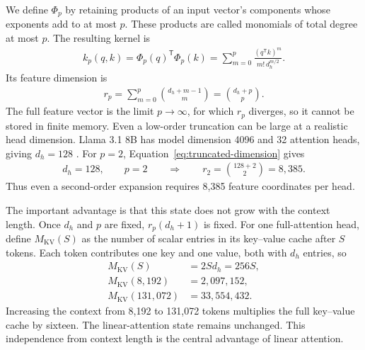 \documentclass[11pt]{article}
\begin{document}
We define $\Phi_p$ by retaining products of an input vector's components whose
exponents add to at most $p$.  These products are called monomials of total
degree at most $p$.  The resulting kernel is
\begin{equation}
  \begin{split}
  k_p(q,k)
  =\Phi_p(q)^{\mathsf T}\Phi_p(k)
  =\sum_{m=0}^{p}\frac{(q^{\mathsf T}k)^m}{m!\,d_h^{m/2}}.
  \label{eq:truncated-kernel}
  \end{split}
\end{equation}
Its feature dimension is
\begin{equation}
  \begin{split}
  r_p
  =\sum_{m=0}^{p}\binom{d_h+m-1}{m}
  =\binom{d_h+p}{p}.
  \label{eq:truncated-dimension}
  \end{split}
\end{equation}
The full feature vector is the limit $p\to\infty$, for which $r_p$ diverges,
so it cannot be stored in finite memory.  Even a low-order truncation can be
large at a realistic head dimension.  Llama 3.1 8B has model dimension 4096
and 32 attention heads, giving $d_h=128$ \citep{grattafiori2024llama3}.
For $p=2$, Equation~\eqref{eq:truncated-dimension} gives
\begin{equation}
  \begin{split}
  d_h=128,\qquad p=2
  \qquad\Longrightarrow\qquad
  r_2=\binom{128+2}{2}=8{,}385.
  \label{eq:llama-feature-dimension}
  \end{split}
\end{equation}
Thus even a second-order expansion requires 8{,}385 feature coordinates per
head.

The important advantage is that this state does not grow with the context
length.  Once $d_h$ and $p$ are fixed, $r_p(d_h+1)$ is fixed.  For one
full-attention head, define $M_{\mathrm{KV}}(S)$ as the number of scalar
entries in its key--value cache after $S$ tokens.  Each token contributes one
key and one value, both with $d_h$ entries, so
\begin{equation}
  \begin{split}
  M_{\mathrm{KV}}(S)&=2Sd_h=256S,\\
  M_{\mathrm{KV}}(8{,}192)&=2{,}097{,}152,\\
  M_{\mathrm{KV}}(131{,}072)&=33{,}554{,}432.
  \label{eq:llama-kv-growth}
  \end{split}
\end{equation}
Increasing the context from 8{,}192 to 131{,}072 tokens multiplies the full
key--value cache by sixteen.  The linear-attention state remains unchanged.
This independence from context length is the central advantage of linear
attention.
\end{document}
